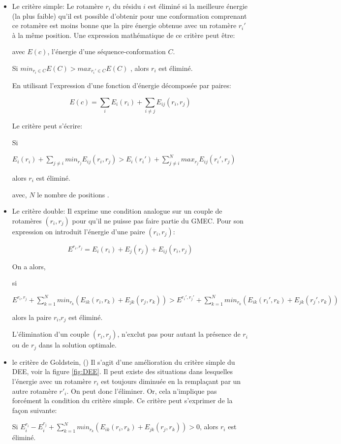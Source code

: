 \begin{itemize}
\item Le critère simple:
  Le rotamère $r_i$ du résidu $i$ est éliminé si la meilleure énergie (la plus faible) qu'il est possible d'obtenir pour une conformation comprenant ce rotamère est moins bonne que la pire énergie obtenue avec un rotamère $r_i'$  à la même position.
Une expression mathématique de ce critère peut être:

avec $E(c)$, l'énergie d'une séquence-conformation $C$.

Si $min_{r_i \in C }E(C) > max_{r_i' \in C} E(C)$ , alors $r_i$ est éliminé. 

En utilisant l'expression d'une fonction d'énergie décomposée par paires:

\begin{equation}
E(c) = \sum_i E_i (r_i) + \sum_{i\neq j} E_{ij} (r_i, r_j)
\end{equation}

Le critère peut s'écrire:

Si

$E_i(r_i) + \sum_{j\neq i} min_{r_j} E_{ij}(r_i,r_j) > E_i(r_i') + \sum_{j\neq i}^{N} max_{r_j}E_{ij}(r_i',r_j)$

alors $r_i$ est éliminé. 

avec, $N$ le nombre de positions .


\item Le critère double:
  Il exprime une condition analogue sur un couple de rotamères $(r_i,r_j)$ pour qu'il ne puisse pas faire partie du GMEC. Pour son expression on introduit l'énergie d'une paire $(r_i,r_j)$:

\begin{equation}

 E^{r_i,r_j} = E_i(r_i) + E_j(r_j) + E_{ij}(r_i,r_j)  
\end{equation}

On a alors,


si

$E^{r_i,r_j} + \sum_{k=1}^N min_{r_k} (E_{ik}(r_i,r_k) + E_{jk}(r_j,r_k)) >  E^{r_i',r_j'} + \sum_{k=1}^N min_{r_k} (E_{ik}(r_i',r_k) + E_{jk}(r_j',r_k))$

alors la paire $r_i$,$r_j$ est éliminé.

L'élimination d'un couple $(r_i,r_j)$, n'exclut pas pour autant la présence de $r_i$ ou de $r_j$ dans la solution optimale. 

\item le critère de Goldstein, (\cite{Goldstein94}) 
  Il s'agit d'une amélioration du critère simple du DEE, voir la figure \ref{fig:DEE}. Il peut existe des situations dans lesquelles l'énergie avec un rotamère $r_i$  est toujours diminuée en la remplaçant par un autre rotamère $r'_i$. On peut donc l'éliminer. Or, cela n'implique pas forcément la condition du critère simple. Ce critère peut s'exprimer de la façon suivante:

Si $E_i^{r_i} - E_i^{r_j}+ \sum_{k=1}^N min_{r_k} (E_{ik}(r_i,r_k) + E_{jk}(r_j,r_k)) > 0$, alors $r_i$ est éliminé.

\end{itemize}

